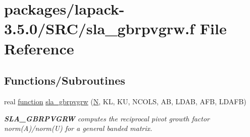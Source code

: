\hypertarget{sla__gbrpvgrw_8f}{}\section{packages/lapack-\/3.5.0/\+S\+R\+C/sla\+\_\+gbrpvgrw.f File Reference}
\label{sla__gbrpvgrw_8f}
\subsection*{Functions/\+Subroutines}
\begin{DoxyCompactItemize}
\item 
real \hyperlink{afunc_8m_a7b5e596df91eadea6c537c0825e894a7}{function} \hyperlink{group__realGBcomputational_gaebfb2731781fd1734b41bc3cc0222711}{sla\+\_\+gbrpvgrw} (\hyperlink{polmisc_8c_a0240ac851181b84ac374872dc5434ee4}{N}, K\+L, K\+U, N\+C\+O\+L\+S, A\+B, L\+D\+A\+B, A\+F\+B, L\+D\+A\+F\+B)
\begin{DoxyCompactList}\small\item\em {\bfseries S\+L\+A\+\_\+\+G\+B\+R\+P\+V\+G\+R\+W} computes the reciprocal pivot growth factor norm(\+A)/norm(U) for a general banded matrix. \end{DoxyCompactList}\end{DoxyCompactItemize}
